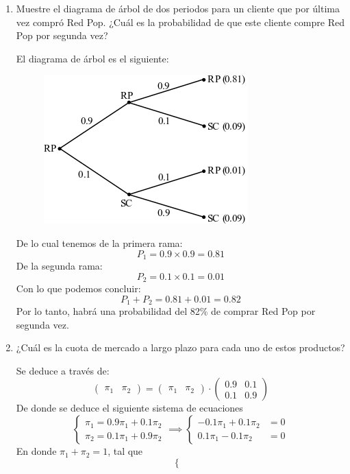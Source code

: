 \begin{problema}
\begin{enumerate}
	\item Muestre el diagrama de árbol de dos periodos para un cliente que por última vez compró Red Pop. ¿Cuál es la
	probabilidad de que este cliente compre Red Pop por segunda vez?
	\begin{sol}
		El diagrama de árbol es el siguiente: 
		\begin{figure}[H]
			\centering
			\includegraphics[scale=0.5]{Images/1.1}
		\end{figure}
	De lo cual tenemos de la primera rama: 
	$$P_1= 0.9\times 0.9=0.81$$
	De la segunda rama: 
	$$P_2=0.1\times 0.1= 0.01$$
	Con lo que podemos concluir: 
	$$P_1+P_2= 0.81+0.01=0.82$$
	Por lo tanto, habrá una probabilidad del 82\% de comprar Red Pop por segunda vez. 
	\end{sol}
	\item ¿Cuál es la cuota de mercado a largo plazo para cada uno de estos productos?
	\begin{sol}
		Se deduce a través de: 
		$$\begin{pmatrix}
			\pi_1 & \pi_2 
		\end{pmatrix} =\begin{pmatrix}
		\pi_1 & \pi_2 
	\end{pmatrix} \cdot \begin{pmatrix}
		0.9 & 0.1\\
		0.1 & 0.9
	\end{pmatrix}$$
De donde se deduce el siguiente sistema de ecuaciones 
$$ \begin{cases}
	\pi_1 = 0.9\pi_1 +0.1 \pi_2\\
	\pi_2 = 0.1 \pi_1+ 0.9\pi_2
\end{cases} \implies \begin{cases}
-0.1\pi_1 +0.1\pi_2&=0\\
0.1\pi_1 -0.1\pi_2 &=0
\end{cases}  $$
En donde $\pi_1+\pi_2=1$, tal que 
$$\begin{cases}

\end{cases}$$
\end{sol}
\end{enumerate}
\end{problema}
